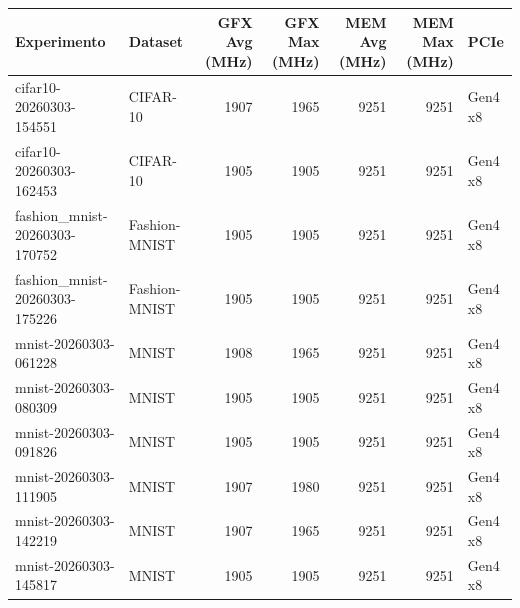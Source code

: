 \begin{tabular}{llrrrrl}
\toprule
Experimento & Dataset & GFX Avg (MHz) & GFX Max (MHz) & MEM Avg (MHz) & MEM Max (MHz) & PCIe \\
\midrule
cifar10-20260303-154551 & CIFAR-10 & 1907 & 1965 & 9251 & 9251 & Gen4 x8 \\
cifar10-20260303-162453 & CIFAR-10 & 1905 & 1905 & 9251 & 9251 & Gen4 x8 \\
fashion_mnist-20260303-170752 & Fashion-MNIST & 1905 & 1905 & 9251 & 9251 & Gen4 x8 \\
fashion_mnist-20260303-175226 & Fashion-MNIST & 1905 & 1905 & 9251 & 9251 & Gen4 x8 \\
mnist-20260303-061228 & MNIST & 1908 & 1965 & 9251 & 9251 & Gen4 x8 \\
mnist-20260303-080309 & MNIST & 1905 & 1905 & 9251 & 9251 & Gen4 x8 \\
mnist-20260303-091826 & MNIST & 1905 & 1905 & 9251 & 9251 & Gen4 x8 \\
mnist-20260303-111905 & MNIST & 1907 & 1980 & 9251 & 9251 & Gen4 x8 \\
mnist-20260303-142219 & MNIST & 1907 & 1965 & 9251 & 9251 & Gen4 x8 \\
mnist-20260303-145817 & MNIST & 1905 & 1905 & 9251 & 9251 & Gen4 x8 \\
\bottomrule
\end{tabular}